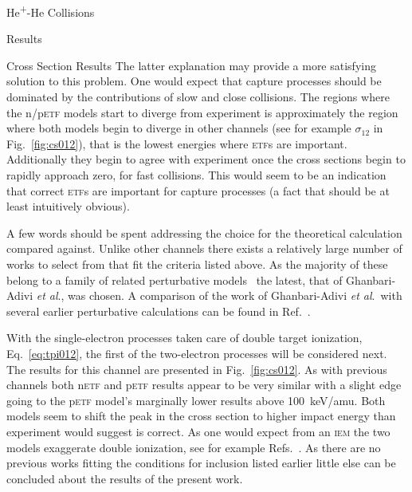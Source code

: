 \documentclass[letterpaper, 11 pt]{report}
\begin{document}
\begin{chapter}{\texorpdfstring{He\textsuperscript{+}}{He+}-He Collisions \label{chap:hephe}}
\begin{section}{Results \label{sec:hephe-disc}}
\begin{subsection}{Cross Section Results \label{sec:hephe-res}}
         The latter explanation may provide a more satisfying solution to this problem. One would expect
         that capture processes should be dominated by the contributions of slow and close collisions.
         The regions where the n/p\textsc{etf} models start to diverge from experiment is approximately
         the region where both models begin to diverge in other channels (see for example $\sigma_{12}$
         in Fig.~\ref{fig:cs012}), that is the lowest energies where \textsc{etf}s are important.
         Additionally they begin to agree with experiment once the cross sections begin to rapidly
         approach zero, for fast collisions. This would seem to be an indication that correct
         \textsc{etf}s are important for capture processes (a fact that should be at least intuitively
         obvious).

         A few words should be spent addressing the choice for the theoretical calculation compared
         against. Unlike other channels there exists a relatively large number of works to select from
         that fit the criteria listed above. As the majority of these belong to a family of related
         perturbative models~\cite{Mancev96, BOC05, Mancev-07, MG-10, NTC11, GG-12b, GAG15} the latest,
         that of Ghanbari-Adivi \textit{et al}., was chosen. A comparison of the work of Ghanbari-Adivi
         \textit{et al}.\ with several earlier perturbative calculations can be found in
         Ref.~\cite{GAG15}.

         With the single-electron processes taken care of double target ionization,
         Eq.~\eqref{eq:tpi012}, the first of the two-electron processes will be considered next. The
         results for this channel are presented in Fig.~\ref{fig:cs012}. As with previous channels both
         n\textsc{etf} and p\textsc{etf} results appear to be very similar with a slight edge going to
         the p\textsc{etf} model's marginally lower results above 100~keV/amu. Both models seem to shift
         the peak in the cross section to higher impact energy than experiment would suggest is correct.
         As one would expect from an \textsc{iem} the two models exaggerate double ionization, see for
         example Refs.~\cite{pbarhe-rev, p-he2p-he}. As there are no previous works fitting the
         conditions for inclusion listed earlier little else can be concluded about the results of the
         present work.


\end{subsection}
\end{section}
\end{chapter}
\end{document}
